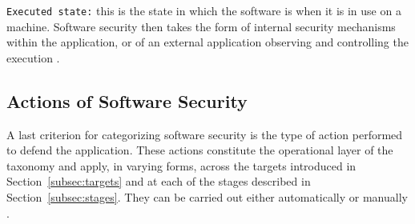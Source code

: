 \texttt{Executed state:} this is the state in which the software is when
it is in use on a machine. Software security then takes the form of internal
security mechanisms within the application, or of an external application
observing and controlling the execution \citep{placeholder-detection-survey}.

\subsection{Actions of Software Security}

A last criterion for categorizing software security is the type of action
performed to defend the application. These actions constitute the
operational layer of the taxonomy and apply, in varying forms, across the
targets introduced in Section~\ref{subsec:targets} and at each of the
stages described in Section~\ref{subsec:stages}. They can be carried out
either automatically or manually \citep{placeholder-sast}.

